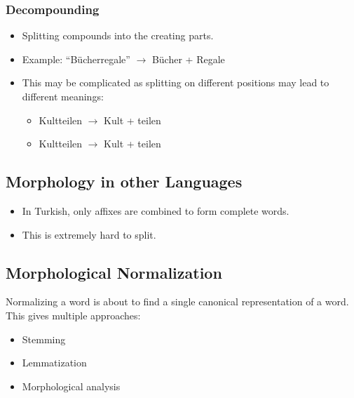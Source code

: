 			\subsubsection{Decompounding} %
				\begin{itemize}
					\item Splitting compounds into the creating parts.
					\item Example: \enquote{Bücherregale} \(\rightarrow\) Bücher + Regale
					\item This may be complicated as splitting on different positions may lead to different meanings:
						\begin{itemize}
							\item Kult\ambiguity{ur}teilen \(\rightarrow\) Kult + teilen
							\item Kultteilen \(\rightarrow\) Kult + teilen
						\end{itemize}
				\end{itemize}

		\subsection{Morphology in other Languages} %
			\begin{itemize}
				\item In Turkish, only affixes are combined to form complete words.
				\item This is extremely hard to split.
			\end{itemize}

		\subsection{Morphological Normalization} %
			Normalizing a word is about to find a single canonical representation of a word. This gives multiple approaches:
			\begin{itemize}
				\item Stemming
				\item Lemmatization
				\item Morphological analysis
			\end{itemize}

